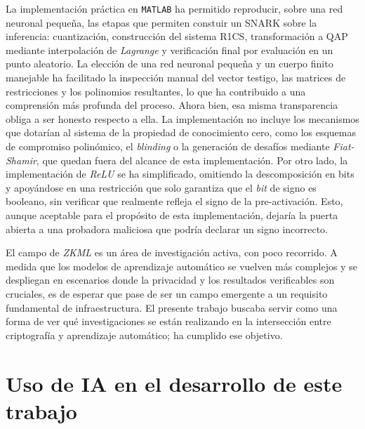 \documentclass[a4paper, 11pt]{article}
\begin{document}
La implementación práctica en \texttt{MATLAB} ha permitido reproducir, sobre una red neuronal pequeña,
las etapas que permiten constuir un SNARK sobre la inferencia: cuantización, construcción del sistema
R1CS, transformación a QAP mediante interpolación de \textit{Lagrange} y verificación final por
evaluación en un punto aleatorio. La elección de una red neuronal pequeña y un cuerpo finito manejable
ha facilitado la inspección manual del vector testigo, las matrices de restricciones y los polinomios
resultantes, lo que ha contribuido a una comprensión más profunda del proceso. Ahora bien, esa misma
transparencia obliga a ser honesto respecto a ella. La implementación no incluye los mecanismos que
dotarían al sistema de la propiedad de conocimiento cero, como los esquemas de compromiso polinómico,
el \textit{blinding} o la generación de desafíos mediante \textit{Fiat-Shamir}, que quedan fuera del
alcance de esta implementación. Por otro lado, la implementación de \textit{ReLU} se ha simplificado,
omitiendo la descomposición en bits y apoyándose en una restricción que solo garantiza que el
\textit{bit} de signo es booleano, sin verificar que realmente refleja el signo de la pre-activación.
Esto, aunque aceptable para el propósito de esta implementación, dejaría la puerta abierta a una
probadora maliciosa que podría declarar un signo incorrecto.

El campo de \textit{ZKML} es un área de investigación activa, con poco recorrido. A medida que los
modelos de aprendizaje automático se vuelven más complejos y se despliegan en escenarios donde la
privacidad y los resultados verificables son cruciales, es de esperar que pase de ser un campo
emergente a un requisito fundamental de infraestructura. El presente trabajo buscaba servir como una
forma de ver qué investigaciones se están realizando en la intersección entre criptografía y
aprendizaje automático; ha cumplido ese objetivo.

\pagebreak

\appendix
\section{Uso de IA en el desarrollo de este trabajo} \label{uso_ia}
\end{document}
